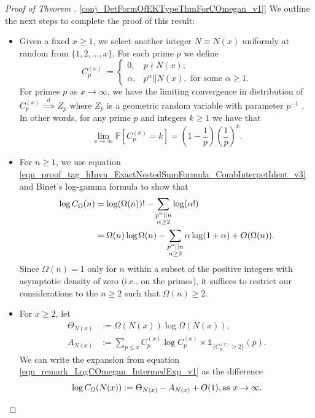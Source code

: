 \documentclass[11pt,reqno,a4letter]{article}
\newcommand{\hlocalref}[1]{\hyperref[#1]{\ref{#1}}}
\numberwithin{equation}{section}
\numberwithin{figure}{section}
\numberwithin{table}{section}
\let\citep\cite
\theoremstyle{plain}
\numberwithin{theorem}{section}
\theoremstyle{definition}
\theoremstyle{remark}
\newcommand{\mathtext}[1]{\text{\rm #1}}
\begin{document}
\begin{proof}[Proof of Theorem \hlocalref{conj_DetFormOfEKTypeThmForCOmegan_v1}]
We outline the next steps to complete the proof of this result: 
\begin{itemize}
\item
Given a fixed $x \geq 1$, we select another integer $N \equiv N(x)$ uniformly at random from 
$\{1,2,\ldots,x\}$. For each prime $p$ we define 
\[
C_p^{(x)} := \begin{cases} 0, & p \nmid N(x); \\ 
	\alpha, & p^{\alpha} || N(x), \text{ for some } \alpha \geq 1. 
	\end{cases}
\]
For primes $p$ as $x \rightarrow \infty$, 
we have the limiting convergence in distribution of 
$C_p^{(x)} \overset{d}{\implies} Z_p$ where $Z_p$ is 
a geometric random variable with parameter $p^{-1}$ 
\citep[\S 1.2]{LOG-COMB-STRUCTS-BOOK}. 
In other words, for any prime $p$ and integers $k \geq 1$ we have that 
\[
\lim_{x \rightarrow \infty} \mathbb{P}\left[C_p^{(x)} = k\right] = 
     \left(1 - \frac{1}{p}\right)\left(\frac{1}{p}\right)^k. 
\]
\item 
For $n \geq 1$, we use 
equation \eqref{eqn_proof_tag_hInvn_ExactNestedSumFormula_CombInterpetIdent_v3} and 
Binet's log-gamma formula \cite[\S 5.9(i)]{NISTHB} to show that 
\begin{align}
\notag
\log C_{\Omega}(n) & = \log (\Omega(n))! - 
	\sum_{\substack{p^{\alpha}||n \\ \alpha \geq 2}} \log(\alpha!) \\ 
\label{eqn_remark_LogCOmegan_IntermedExp_v1}
	& = \Omega(n) \log \Omega(n) - \sum_{\substack{p^{\alpha}||n \\ \alpha \geq 2}} 
	\alpha \log(1 + \alpha) + O(\Omega(n)). 
\end{align}
Since $\Omega(n) = 1$ only for $n$ within a subset of the positive 
integers with asymptotic density of zero (i.e., on the primes), 
it suffices to restrict our considerations 
to the $n \geq 2$ such that $\Omega(n) \geq 2$. 
\item 
For $x \geq 2$, let 
\begin{align*}
\Theta_{N(x)} & := \Omega(N(x)) \log \Omega(N(x)), \\ 
A_{N(x)} & := \sum_{p \leq x} C_p^{(x)} \log C_p^{(x)} \times \mathds{1}_{\{C_p^{(x)} \geq 2\}}(p). 
\end{align*}
We can write the expansion from equation 
\eqref{eqn_remark_LogCOmegan_IntermedExp_v1} as the difference 
$$\log C_{\Omega}(N(x)) := \Theta_{N(x)} - A_{N(x)} + O(1), \mathtext{ as } x \rightarrow \infty.$$ 

\end{itemize}
\end{proof}
\end{document}
